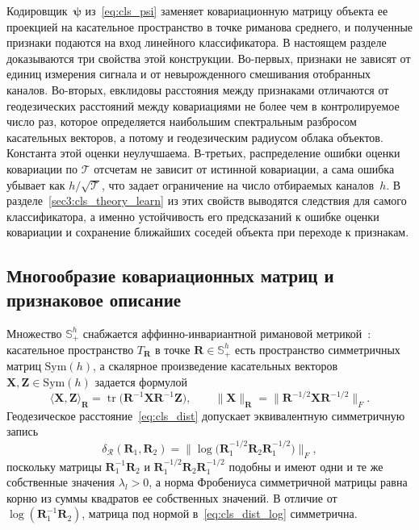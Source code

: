 Кодировщик~$\boldsymbol{\psi}$ из~\eqref{eq:cls_psi} заменяет ковариационную матрицу объекта ее проекцией на касательное пространство в точке риманова среднего, и полученные признаки подаются на вход линейного классификатора. В настоящем разделе доказываются три свойства этой конструкции. Во-первых, признаки не зависят от единиц измерения сигнала и от невырожденного смешивания отобранных каналов. Во-вторых, евклидовы расстояния между признаками отличаются от геодезических расстояний между ковариациями не более чем в контролируемое число раз, которое определяется наибольшим спектральным разбросом касательных векторов, а потому и геодезическим радиусом облака объектов. Константа этой оценки неулучшаема. В-третьих, распределение ошибки оценки ковариации по $\mathcal{T}$ отсчетам не зависит от истинной ковариации, а сама ошибка убывает как $h/\sqrt{\mathcal{T}}$, что задает ограничение на число отбираемых каналов~$h$. В разделе~\ref{sec3:cls_theory_learn} из этих свойств выводятся следствия для самого классификатора, а именно устойчивость его предсказаний к ошибке оценки ковариации и сохранение ближайших соседей объекта при переходе к признакам.

\subsection{Многообразие ковариационных матриц и признаковое описание}\label{sec3:cls_theory_geom}

Множество $\mathbb{S}_{+}^{h}$ снабжается аффинно-инвариантной римановой метрикой~\cite{bhatia2007positive}: касательное пространство $T_{\mathbf{R}}$ в точке $\mathbf{R} \in \mathbb{S}_{+}^{h}$ есть пространство симметричных матриц $\mathrm{Sym}(h)$, а скалярное произведение касательных векторов $\mathbf{X}, \mathbf{Z} \in \mathrm{Sym}(h)$ задается формулой
\begin{equation}\label{eq:cls_metric}
\langle \mathbf{X}, \mathbf{Z} \rangle_{\mathbf{R}} = \operatorname{tr}\big(\mathbf{R}^{-1} \mathbf{X} \mathbf{R}^{-1} \mathbf{Z}\big),
\qquad
\|\mathbf{X}\|_{\mathbf{R}} = \big\| \mathbf{R}^{-1/2} \mathbf{X} \mathbf{R}^{-1/2} \big\|_F .
\end{equation}
Геодезическое расстояние~\eqref{eq:cls_dist} допускает эквивалентную симметричную запись
\begin{equation}\label{eq:cls_dist_log}
\delta_{\mathcal{R}}(\mathbf{R}_1, \mathbf{R}_2) = \big\| \log\big( \mathbf{R}_1^{-1/2} \mathbf{R}_2 \mathbf{R}_1^{-1/2} \big) \big\|_F ,
\end{equation}
поскольку матрицы $\mathbf{R}_1^{-1}\mathbf{R}_2$ и $\mathbf{R}_1^{-1/2}\mathbf{R}_2\mathbf{R}_1^{-1/2}$ подобны и имеют одни и те же собственные значения $\lambda_l > 0$, а норма Фробениуса симметричной матрицы равна корню из суммы квадратов ее собственных значений. В отличие от $\log(\mathbf{R}_1^{-1}\mathbf{R}_2)$, матрица под нормой в~\eqref{eq:cls_dist_log} симметрична.

